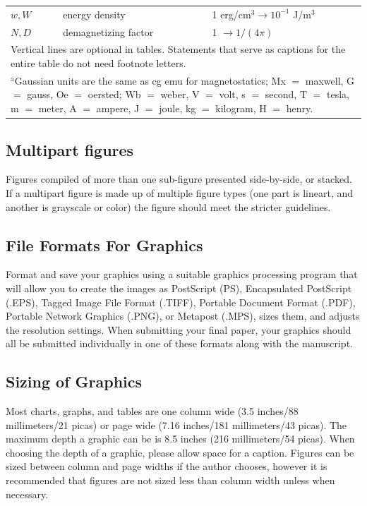 \documentclass[twoside,web]{ieeecolor}
\begin{document}
\begin{table}
\begin{tabular}{|p{25pt}|p{75pt}|p{115pt}|}
$w, W$& 
energy density& 
1 erg/cm$^{3} \to  10^{-1}$ J/m$^{3}$ \\
$N, D$& 
demagnetizing factor& 
1 $\to  1/(4\pi )$ \\
\hline
\multicolumn{3}{p{251pt}}{Vertical lines are optional in tables. Statements that serve as captions for 
the entire table do not need footnote letters. }\\
\multicolumn{3}{p{251pt}}{$^{\mathrm{a}}$Gaussian units are the same as cg emu for magnetostatics; Mx 
$=$ maxwell, G $=$ gauss, Oe $=$ oersted; Wb $=$ weber, V $=$ volt, s $=$ 
second, T $=$ tesla, m $=$ meter, A $=$ ampere, J $=$ joule, kg $=$ 
kilogram, H $=$ henry.}
\end{tabular}
\label{tab1}
\end{table}

\subsection{Multipart figures}
Figures compiled of more than one sub-figure presented side-by-side, or 
stacked. If a multipart figure is made up of multiple figure
types (one part is lineart, and another is grayscale or color) the figure 
should meet the stricter guidelines.

\subsection{File Formats For Graphics}\label{formats}
Format and save your graphics using a suitable graphics processing program 
that will allow you to create the images as PostScript (PS), Encapsulated 
PostScript (.EPS), Tagged Image File Format (.TIFF), Portable Document 
Format (.PDF), Portable Network Graphics (.PNG), or Metapost (.MPS), sizes them, and adjusts 
the resolution settings. When 
submitting your final paper, your graphics should all be submitted 
individually in one of these formats along with the manuscript.

\subsection{Sizing of Graphics}
Most charts, graphs, and tables are one column wide (3.5 inches/88 
millimeters/21 picas) or page wide (7.16 inches/181 millimeters/43 
picas). The maximum depth a graphic can be is 8.5 inches (216 millimeters/54
picas). When choosing the depth of a graphic, please allow space for a 
caption. Figures can be sized between column and page widths if the author 
chooses, however it is recommended that figures are not sized less than 
column width unless when necessary. 
\end{document}
